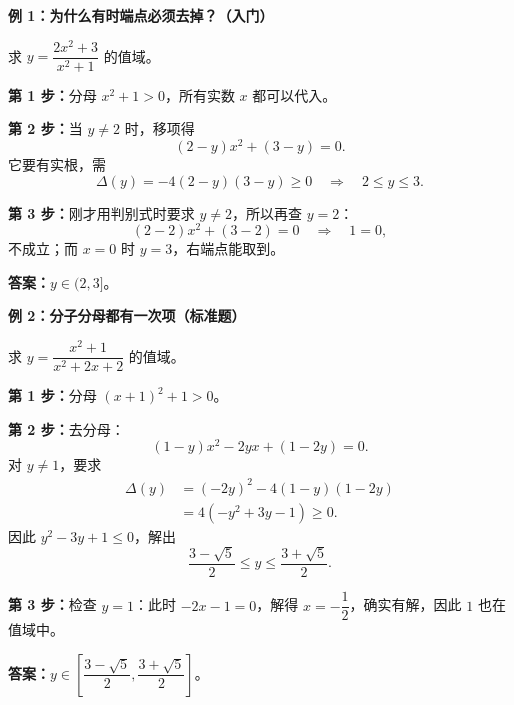 \clearpage
\begin{examplebox}
  \begin{minipage}{\linewidth}
\textbf{\textcolor{CExample}{例 1：为什么有时端点必须去掉？（入门）}}
\begin{center}\end{center}
\end{minipage}



  \medskip
  求 $y=\dfrac{2x^2+3}{x^2+1}$ 的值域。

  \medskip
  \textbf{第 1 步：}分母 $x^2+1>0$，所有实数 $x$ 都可以代入。

  \textbf{第 2 步：}当 $y\ne2$ 时，移项得
  \[
    (2-y)x^2+(3-y)=0.
  \]
  它要有实根，需
  \[
    \Delta(y)=-4(2-y)(3-y)\ge0
    \quad\Longrightarrow\quad 2\le y\le3.
  \]

  \textbf{第 3 步：}刚才用判别式时要求 $y\ne2$，所以再查 $y=2$：
  \[
    (2-2)x^2+(3-2)=0
    \quad\Longrightarrow\quad 1=0,
  \]
  不成立；而 $x=0$ 时 $y=3$，右端点能取到。

  \textbf{答案：}\quad $\boxed{y\in(2,3]}$。

  \medskip
\end{examplebox}
\clearpage
\begin{examplebox}
\textbf{\textcolor{CExample}{例 2：分子分母都有一次项（标准题）}}
\begin{center}\end{center}


  \medskip
  求 $y=\dfrac{x^2+1}{x^2+2x+2}$ 的值域。

  \medskip
  \textbf{第 1 步：}分母 $(x+1)^2+1>0$。

  \textbf{第 2 步：}去分母：
  \[
    (1-y)x^2-2yx+(1-2y)=0.
  \]
  对 $y\ne1$，要求
  \[
    \begin{aligned}
      \Delta(y)&=(-2y)^2-4(1-y)(1-2y)\\
      &=4(-y^2+3y-1)\ge0.
    \end{aligned}
  \]
  因此 $y^2-3y+1\le0$，解出
  \[
    \frac{3-\sqrt5}{2}\le y\le\frac{3+\sqrt5}{2}.
  \]

  \textbf{第 3 步：}检查 $y=1$：此时 $-2x-1=0$，解得 $x=-\dfrac12$，确实有解，因此 $1$ 也在值域中。

  \textbf{答案：}\quad $\boxed{y\in\left[\dfrac{3-\sqrt5}{2},\dfrac{3+\sqrt5}{2}\right]}$。

  \medskip
\end{examplebox}
